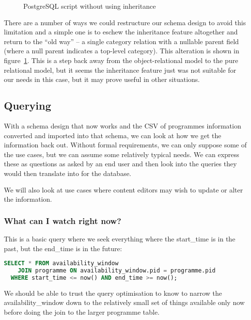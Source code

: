 \documentclass[11pt,a4paper]{article}
\begin{document}
\begin{figure}[p]
  
  \caption{PostgreSQL script without using inheritance}
  \label{fig:flatten-category}
\end{figure}

There are a number of ways we could restructure our schema design to
avoid this limitation and a simple one is to eschew the inheritance feature
altogether and return to the ``old way'' -- a single category relation
with a nullable parent field (where a null parent indicates a top-level
category). This alteration is shown in figure~\ref{fig:flatten-category}.
This is a step back away from the object-relational model to the pure
relational model, but it seems the inheritance feature just was not
suitable for our needs in this case, but it may prove useful in other
situations.

\subsection{Querying}

With a schema design that now works and the CSV of programmes information
converted and imported into that schema, we can look at how we get
the information back out. Without formal requirements, we can only
suppose some of the use cases, but we can assume some relatively typical
needs. We can express these as questions as asked by an end user and then
look into the queries they would then translate into for the database.

We will also look at use cases where content editors may wish to update
or alter the information.

\subsubsection{What can I watch right now?}

This is a basic query where we seek everything where the start\_time is
in the past, but the end\_time is in the future:

\begin{lstlisting}[language=SQL]
  SELECT * FROM availability_window
    JOIN programme ON availability_window.pid = programme.pid
  WHERE start_time <= now() AND end_time >= now();
\end{lstlisting}

We should be able to trust the query optimisation to know to
narrow the availability\_window down to the relatively small set
of things available only now before doing the join to the larger
programme table.
\end{document}
